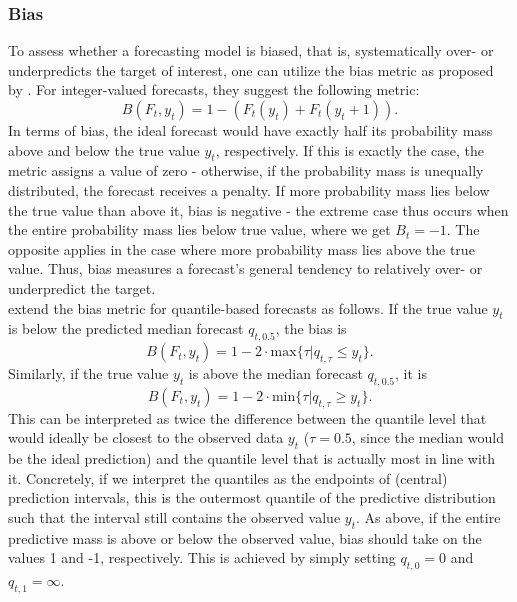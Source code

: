 \subsubsection{Bias}
To assess whether a forecasting model is biased, that is, systematically over- or underpredicts the target of interest, one can utilize the bias metric as proposed by \cite{funk_assessing_nodate}. For integer-valued forecasts, they suggest the following metric:
\begin{equation*}
B(F_t, y_t) = 1 - (F_t(y_t) + F_t(y_t + 1)).
\end{equation*}
In terms of bias, the ideal forecast would have exactly half its probability mass above and below the true value $y_t$, respectively. If this is exactly the case, the metric assigns a value of zero - otherwise, if the probability mass is unequally distributed, the forecast receives a penalty. If more probability mass lies below  the true value than above it, bias is negative - the extreme case thus occurs when the entire probability mass lies below true value, where we get $B_t = -1$. The opposite applies in the case where more probability mass lies above the true value. Thus, bias measures a forecast's general tendency to relatively over- or underpredict the target.\\
\cite{bosse_evaluating_2022} extend the bias metric for quantile-based forecasts as follows. If the true value $y_t$ is below the predicted median forecast $q_{t,0.5}$, the bias is 
\begin{equation*}
B(F_t, y_t) = 1 - 2 \cdot \text{max}\{\tau | q_{t,\tau} \leq y_t \}.
\end{equation*}
Similarly, if the true value $y_t$ is above the median forecast $q_{t,0.5}$, it is
\begin{equation*}
B(F_t, y_t) = 1 - 2 \cdot \text{min}\{\tau | q_{t,\tau} \geq y_t \}.
\end{equation*}
This can be interpreted as twice the difference between the quantile level that would ideally be closest to the observed data $y_t$ ($\tau = 0.5$, since the median would be the ideal prediction) and the quantile level that is actually most in line with it. Concretely, if we interpret the quantiles as the endpoints of (central) prediction intervals, this is the outermost quantile of the predictive distribution such that the interval still contains the observed value $y_t$. As above, if the entire predictive mass is above or below the observed value, bias should take on the values 1 and -1, respectively. This is achieved by simply setting $q_{t,0} = 0$ and $q_{t,1} = \infty$.\\
